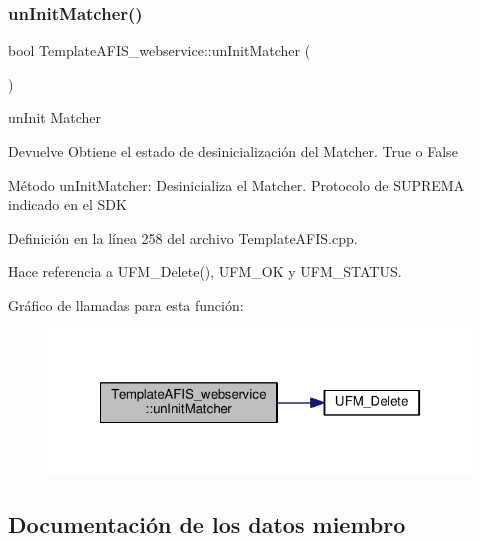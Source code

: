 \subsubsection{\texorpdfstring{un\+Init\+Matcher()}{unInitMatcher()}}
{\footnotesize\ttfamily bool Template\+A\+F\+I\+S\+\_\+webservice\+::un\+Init\+Matcher (\begin{DoxyParamCaption}{ }\end{DoxyParamCaption})}



un\+Init Matcher 

\begin{DoxyReturn}{Devuelve}
Obtiene el estado de desinicialización del Matcher. True o False
\end{DoxyReturn}
Método un\+Init\+Matcher\+: Desinicializa el Matcher. Protocolo de S\+U\+P\+R\+E\+MA indicado en el S\+DK 

Definición en la línea 258 del archivo Template\+A\+F\+I\+S.\+cpp.



Hace referencia a U\+F\+M\+\_\+\+Delete(), U\+F\+M\+\_\+\+OK y U\+F\+M\+\_\+\+S\+T\+A\+T\+US.

Gráfico de llamadas para esta función\+:\nopagebreak
\begin{figure}[H]
\begin{center}
\leavevmode
\includegraphics[width=322pt]{classTemplateAFIS__webservice_a90522f2c2f10ae8fa3ab6abd0273b714_cgraph}
\end{center}
\end{figure}


\subsection{Documentación de los datos miembro}
\hypertarget{classTemplateAFIS__webservice_a09c632296df4dd488ab09fee6e26f4eb}{}\label{classTemplateAFIS__webservice_a09c632296df4dd488ab09fee6e26f4eb} 
